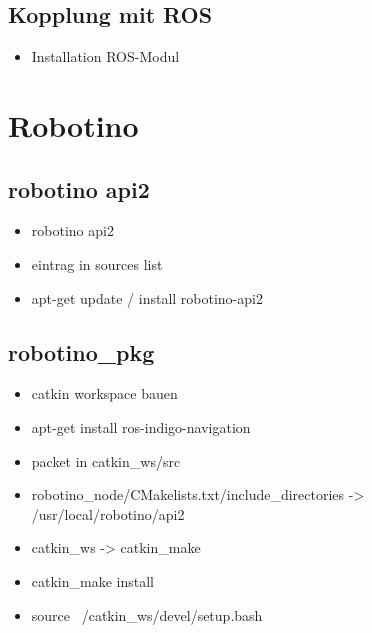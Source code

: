 		\subsection{Kopplung mit ROS}
			\begin{itemize}
			\item Installation ROS-Modul
			\end{itemize}
	\section{Robotino}
		\subsection{robotino api2}
		\begin{itemize}
		\item robotino api2
		\item eintrag in sources list
		\item apt-get update / install robotino-api2
		\end{itemize}
		\subsection{robotino\_pkg}
		\begin{itemize}
		\item catkin workspace bauen
		\item apt-get install ros-indigo-navigation
		\item packet in catkin\_ws/src
		\item robotino\_node/CMakelists.txt/include\_directories -> /usr/local/robotino/api2
		\item catkin\_ws -> catkin\_make
		\item catkin\_make install
		\item source ~/catkin\_ws/devel/setup.bash
		\end{itemize}
		
		